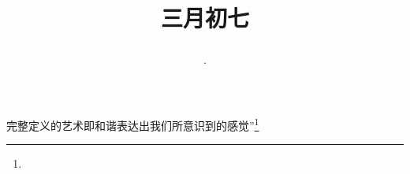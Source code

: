 \title{\date[d=15,m=4,y=2024][year:cn-y,年,month:cn,day:cn,日,·,weekday]·三月初七 }
完整定义的艺术即和谐表达出我们所意识到的感觉”\footnote{ }

